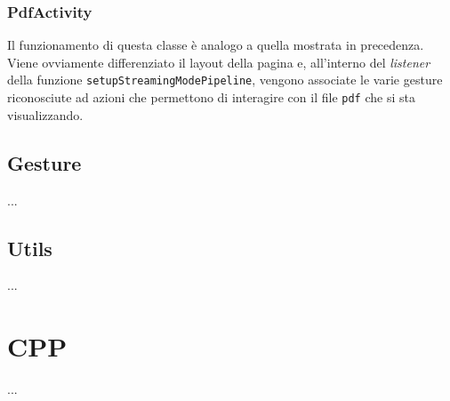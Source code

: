 \subsubsection{PdfActivity}
Il funzionamento di questa classe è analogo a quella mostrata in precedenza. Viene ovviamente differenziato il layout della pagina e, all'interno del \textit{listener} della funzione \texttt{setupStreamingModePipeline}, vengono associate le varie gesture riconosciute ad azioni che permettono di interagire con il file \texttt{pdf} che si sta visualizzando.


\subsection{Gesture}
...

\subsection{Utils}
...

\section{CPP}
...